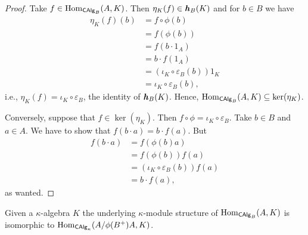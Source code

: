 \begin{proof}
    Take $f\in{\rm Hom}_{\mathsf{CAlg}_B}(A,K)$. Then $\eta_K(f)\in\textrm{\boldmath$\mathit h$}_B(K)$ and for $b\in B$ we have
    \begin{align*}
        \eta_K(f)(b) &= f\circ\phi(b)\\
            &= f(\phi(b))\\
            &= f(b\cdot1_A)\\
            &= b\cdot f(1_A)\\
            &= (\iota_K\circ\varepsilon_B(b))1_K\\
            &= \iota_K\circ\varepsilon_B(b),
    \end{align*}
    i.e., $\eta_K(f)=\iota_K\circ\varepsilon_B$, the identity of $\textrm{\boldmath$\mathit h$}_B(K)$. Hence, ${\rm Hom}_{\mathsf{CAlg}_B}(A,K)\subseteq\ker(\eta_K)$.

    Conversely, suppose that $f\in\ker(\eta_K)$. Then $f\circ\phi=\iota_K\circ\varepsilon_B$. Take $b\in B$ and $a\in A$. We have to show that $f(b\cdot a)=b\cdot f(a)$. But
    \begin{align*}
        f(b\cdot a) &= f(\phi(b)a)\\
            &= f(\phi(b))f(a)\\
            &= (\iota_K\circ\varepsilon_B(b))f(a)\\
            &= b\cdot f(a),
    \end{align*}
    as wanted.
\end{proof}

\begin{prop}\label{prop:ker(eta_K)-2}
    Given a\/ $\kappa$-algebra\/ $K$ the underlying\/ $\kappa$-module structure of\/ ${\rm Hom}_{\mathsf{CAlg}_B}(A,K)$ is isomorphic to\/ ${\rm Hom}_{\mathsf{CAlg}_\kappa}(A/\phi(B^+)A,K)$.
\end{prop}

